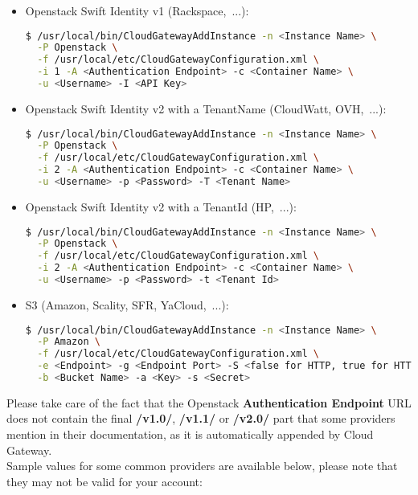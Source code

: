 \documentclass[11pt,fleqn,openany]{book} %
\begin{document}
\begin{itemize}

\item Openstack Swift Identity v1 (Rackspace,~...):
\begin{lstlisting}[language=bash]
$ /usr/local/bin/CloudGatewayAddInstance -n <Instance Name> \
  -P Openstack \
  -f /usr/local/etc/CloudGatewayConfiguration.xml \
  -i 1 -A <Authentication Endpoint> -c <Container Name> \
  -u <Username> -I <API Key>
\end{lstlisting}

\item Openstack Swift Identity v2 with a TenantName (CloudWatt, OVH,~...):
\begin{lstlisting}[language=bash]
$ /usr/local/bin/CloudGatewayAddInstance -n <Instance Name> \
  -P Openstack \
  -f /usr/local/etc/CloudGatewayConfiguration.xml \
  -i 2 -A <Authentication Endpoint> -c <Container Name> \
  -u <Username> -p <Password> -T <Tenant Name>
\end{lstlisting}

\item Openstack Swift Identity v2 with a TenantId (HP,~...):
\begin{lstlisting}[language=bash]
$ /usr/local/bin/CloudGatewayAddInstance -n <Instance Name> \
  -P Openstack \
  -f /usr/local/etc/CloudGatewayConfiguration.xml \
  -i 2 -A <Authentication Endpoint> -c <Container Name> \
  -u <Username> -p <Password> -t <Tenant Id>
\end{lstlisting}

\item S3 (Amazon, Scality, SFR, YaCloud,~...):
\begin{lstlisting}[language=bash]
$ /usr/local/bin/CloudGatewayAddInstance -n <Instance Name> \
  -P Amazon \
  -f /usr/local/etc/CloudGatewayConfiguration.xml \
  -e <Endpoint> -g <Endpoint Port> -S <false for HTTP, true for HTTPS> \
  -b <Bucket Name> -a <Key> -s <Secret>
\end{lstlisting}
\end{itemize}

Please take care of the fact that the Openstack \textbf{Authentication Endpoint} URL does not contain the final \textbf{/v1.0/}, \textbf{/v1.1/} or \textbf{/v2.0/} part that some providers
mention in their documentation, as it is automatically appended by Cloud Gateway.\\

Sample values for some common providers are available below, please
note that they may not be valid for your account:\\
\end{document}
